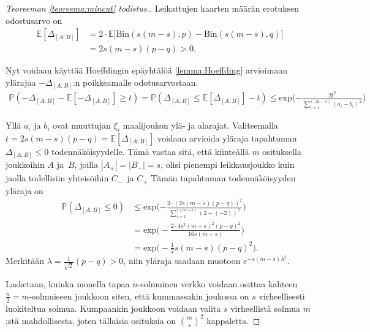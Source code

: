 \documentclass[finnish,12pt,a4paper,pdftex,sci,utf8]{aaltothesis}
\begin{document}
\begin{proof}[Teoreeman \ref{teoreema:mincut} todistus.]
Leikattujen kaarten määrän erotuksen odostusarvo on
\begin{align*}
	\mathbb{E}[\Delta_{[A:B]}] &= 2 \cdot \mathbb{E} \big[ \text{Bin}(s(m-s), p) - \text{Bin}(s(m-s), q) \big] \\
	&= 2 s(m-s)(p-q) > 0.
\end{align*}

Nyt voidaan käyttää Hoeffdingin epäyhtälöä \ref{lemma:Hoeffding} arvioimaan ylärajaa $ -\Delta_{[A:B]}$:n poikkeamalle odotusarvostaan.
\begin{align*}
	\mathbb{P}(- \Delta_{[A:B]} - \mathbb{E}[- \Delta_{[A:B]}] \geq t) = \mathbb{P}(\Delta_{[A:B]} \leq \mathbb{E}[\Delta_{[A:B]}] - t) \leq \text{exp}\bigg({-\frac{2t^2}{\sum_{i=1}^{s(m-s)}(a_i - b_i)^2}}\bigg)
\end{align*}

Yllä $a_i$ ja $b_i$ ovat muuttujan $\xi_i$ maalijoukon ylä- ja alarajat. Valitsemalla $t = 2s(m-s)(p-q) = \mathbb{E}[\Delta_{[A:B]}]$ voidaan arvioida yläraja tapahtuman $\Delta_{[A:B]} \leq 0$ todennäköisyydelle. Tämä vastaa sitä, että kiinteällä $m$ osituksella joukkoihin $A$ ja $B$, joilla $|A_+| = |B_-| = s$, olisi pienempi leikkausjoukko kuin jaolla todellisiin yhteisöihin $C_-$ ja $C_+$ Tämän tapahtuman todennäköisyyden yläraja on
\begin{align*}
	\mathbb{P}(\Delta_{[A:B]} \leq 0) & \leq \text{exp}\bigg({-\frac{2 \cdot (2s(m-s)(p-q))^2}{\sum_{i=1}^{s(m-s)}(2-(-2))^2}}\bigg) \\
	&= \text{exp}\bigg(-\frac{2 \cdot 4s^2(m-s)^2(p-q)^2}{16s(m-s)}\bigg)\\
	&= \text{exp} \big(-\frac{1}{2}s(m-s)(p-q)^2 \big).
\end{align*}
Merkitään $\lambda = \frac{1}{\sqrt2}(p-q) > 0$, niin yläraja saadaan muotoon $e^{-s(m-s)\lambda^2}$.

Lasketaan, kuinka monella tapaa $n$-solmuinen verkko voidaan osittaa kahteen $\frac{n}{2} = m$-solmuiseen joukkoon siten, että kummassakin joukossa on $s$ virheellisesti luokiteltua solmua. Kumpaankin joukkoon voidaan valita $s$ virheellistä solmua $m$:stä mahdollisesta, joten tällaisia osituksia on $\binom{m}{s}^2$ kappaletta.


\end{proof}
\end{document}
